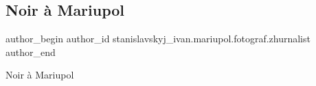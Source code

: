  
 
 
 
 

\subsection{Noir à Mariupol}
\label{sec:10_01_2019.fb.stanislavskyj_ivan.mariupol.fotograf.zhurnalist.1.noir___mariupol}

\ifcmt
 author_begin
   author_id stanislavskyj_ivan.mariupol.fotograf.zhurnalist
 author_end
\fi

Noir à Mariupol
